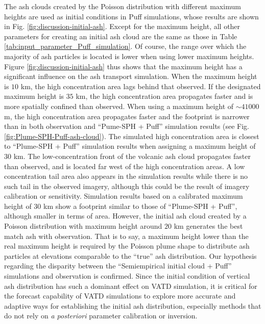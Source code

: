 \documentclass[utf8]{frontiersSCNS} %
\begin{document}
The ash clouds created by the Poisson distribution with different maximum heights are used as initial conditions in Puff simulations, whose results are shown in Fig. \ref{fig:discussion-initial-ash}. Except for the maximum height, all other parameters for creating an initial ash cloud are the same as those in Table \ref{tab:input_parameter_Puff_simulation}. Of course, the range over which the majority of ash particles is located is lower when using lower maximum heights.  Figure \ref{fig:discussion-initial-ash} thus shows that the maximum height has a significant influence on the ash transport simulation. When the maximum height is $10 $ km, the high concentration area  lags behind that observed.  If the designated maximum height is $35 $ km, the high concentration area propagates faster and is more spatially confined than observed. When using a maximum height of $\sim 41000$ m, the high concentration area propagates faster and the footprint is narrower than in both observation and ``Pume-SPH + Puff'' simulation results (see Fig. \ref{fig:Plume-SPH-Puff-ash-cloud}). The simulated high concentration area is closest to ``Plume-SPH + Puff'' simulation results when assigning a maximum height of $30$ km. The low-concentration front of the volcanic ash cloud propagates faster than observed, and is located far west of the high concentration areas. A low concentration tail area also appears in the simulation results while there is no such tail in the observed imagery, although this could be the result of imagery calibration or sensitivity. Simulation results based on a calibrated maximum height of $30 $ km show a footprint similar to those of ``Plume-SPH + Puff'', although smaller in terms of area. However, the initial ash cloud created by a Poisson distribution with maximum height around $20 $ km generates the best match ash with observation. That is to say, a maximum height lower than the real maximum height is required by the Poisson plume shape to distribute ash particles at elevations comparable to the ``true'' ash distribution. Our hypothesis regarding the disparity between the ``Semiempirical initial cloud + Puff'' simulations and observation is confirmed. Since the initial condition of vertical ash distribution has such a dominant effect on VATD simulation, it is critical for the forecast capability of VATD simulations to explore more accurate and adaptive ways for establishing the initial ash distribution, especially methods that do not rely on \textit{a posteriori} parameter calibration or inversion.
\end{document}
